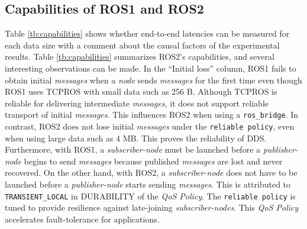 \documentclass{sig-alternate-05-2015}
\begin{document}

\subsection{Capabilities of ROS1 and ROS2}
\label{sec:capacity}

Table \ref{tb:capabilities} shows whether end-to-end latencies can be measured for each data size with a comment about the causal factors of the experimental results.
Table \ref{tb:capabilities} summarizes ROS2's capabilities, and several interesting observations can be made.
In the ``Initial loss'' column, ROS1 fails to obtain initial \emph{messages} when a \emph{node} sends \emph{messages} for the first time even though ROS1 uses TCPROS with small data such as 256 B. 
Although TCPROS is reliable for delivering intermediate \emph{messages}, it does not support reliable transport of initial \emph{messages}.
This influences ROS2 when using a \texttt{ros\_bridge}.
In contrast, ROS2 does not lose initial \emph{messages} under the \texttt{reliable policy}, even when using large data such as 4 MB.
This proves the reliability of DDS. 
Furthermore, with ROS1, a \emph{subscriber-node} must be launched before a \emph{publisher-node} begins to send \emph{messages} because published \emph{messages} are lost and never recovered. 
On the other hand, with ROS2, a \emph{subscriber-node} does not have to be launched before a \emph{publisher-node} starts sending \emph{messages}. 
This is attributed to \texttt{TRANSIENT\_LOCAL} in DURABILITY of the \emph{QoS Policy}.
The \texttt{reliable policy} is tuned to provide resilience against late-joining \emph{subscriber-nodes}.
This \emph{QoS Policy} accelerates fault-tolerance for applications.
\end{document}
